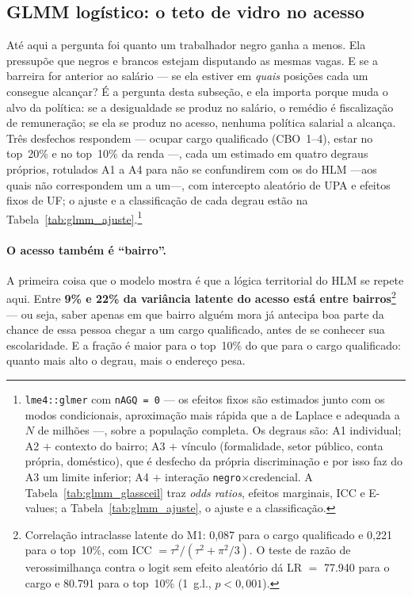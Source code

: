 \documentclass[12pt, a4paper, oneside]{article}
\let\oldsubsectionFB\subsection
\renewcommand{\subsection}{\FloatBarrier\oldsubsectionFB}
\begin{document}
\subsection{GLMM logístico: o teto de vidro no acesso}
\label{subsec:glmm_resultados}
Até aqui a pergunta foi quanto um trabalhador negro ganha a menos. Ela pressupõe que
negros e brancos estejam disputando as mesmas vagas. E se a barreira for anterior ao
salário --- se ela estiver em \emph{quais} posições cada um consegue alcançar? É a
pergunta desta subseção, e ela importa porque muda o alvo da política: se a desigualdade
se produz no salário, o remédio é fiscalização de remuneração; se ela se produz no
acesso, nenhuma política salarial a alcança. Três desfechos respondem --- ocupar cargo
qualificado (CBO~1--4), estar no top~20\% e no top~10\% da renda ---, cada um estimado
em quatro degraus próprios, rotulados A1 a A4 para não se confundirem com os do HLM
---aos quais não correspondem um a um---, com intercepto aleatório de UPA e efeitos fixos
de UF; o ajuste e a classificação de cada degrau estão na Tabela~\ref{tab:glmm_ajuste}.\footnote{\texttt{lme4::glmer} com \texttt{nAGQ = 0} --- os efeitos fixos são estimados
junto com os modos condicionais, aproximação mais rápida que a de Laplace e adequada a $N$
de milhões ---, sobre a população completa.
Os degraus são: A1 individual; A2 $+$ contexto do bairro; A3 $+$ vínculo (formalidade,
setor público, conta própria, doméstico), que é desfecho da própria discriminação e por
isso faz do A3 um limite inferior; A4 $+$ interação \texttt{negro}$\times$credencial. A
Tabela~\ref{tab:glmm_glassceil} traz \emph{odds ratios}, efeitos marginais, ICC e
E-values; a Tabela~\ref{tab:glmm_ajuste}, o ajuste e a classificação.}

\paragraph{O acesso também é ``bairro''.}
A primeira coisa que o modelo mostra é que a lógica territorial do HLM se repete aqui.
Entre \textbf{9\% e 22\% da variância latente do
acesso está entre bairros}\footnote{Correlação intraclasse latente do M1:
0,087 para o cargo qualificado e 0,221 para o top~10\%, com
ICC $= \tau^2/(\tau^2+\pi^2/3)$. O teste de razão de verossimilhança contra o logit sem
efeito aleatório dá LR $=$ 77.940 para o cargo e 80.791 para o top~10\%
(1~g.l., $p<0{,}001$).} --- ou seja, saber apenas em que bairro alguém mora já antecipa
boa parte da chance de essa pessoa chegar a um cargo qualificado, antes de se conhecer
sua escolaridade. E a fração é maior para o top~10\% do que para o cargo qualificado:
quanto mais alto o degrau, mais o endereço pesa.
\end{document}
